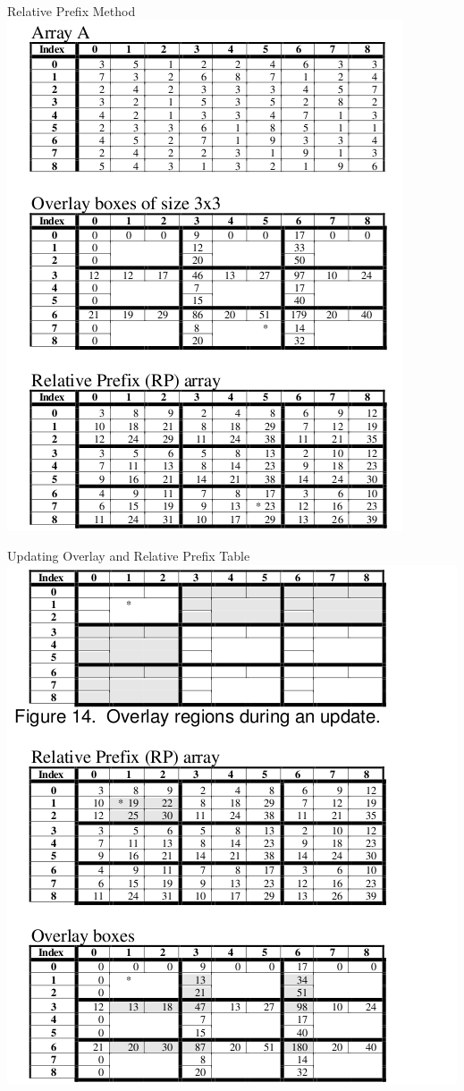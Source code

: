 \documentclass{beamer}
\theoremstyle{definition}
\theoremstyle{definition}
\begin{document}
\begin{frame}{Relative Prefix Method}
\includegraphics[scale=0.4]{relprefix_tables.png}
\cite{Geffner99}
\end{frame}

\begin{frame}{Updating Overlay and Relative Prefix Table}
\includegraphics[scale=0.4]{relprefix_update.png}
\cite{Geffner99}
\end{frame}
\end{document}
